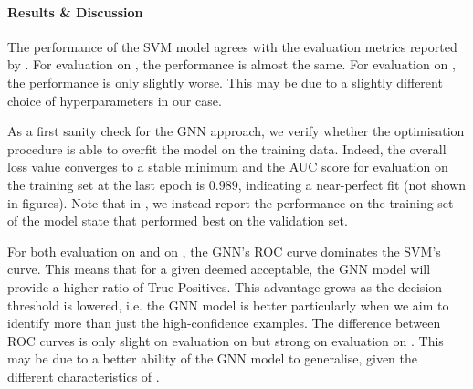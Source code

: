 \documentclass[
	fontsize=10pt, %
	twoside=false, %
	secnumdepth=1, %
  toc=indentunnumbered %
]{kaobook}
\begin{document}
\paragraph{Results \& Discussion}
The performance of the SVM model agrees with the evaluation metrics reported by
\nielsen{}. For evaluation on \PDMap, the performance is almost the same. For
evaluation on \ReconMap{}, the performance is only slightly worse. This may be due
to a slightly different choice of hyperparameters in our case.

As a first sanity check for the GNN approach, we verify whether the optimisation
procedure is able to overfit the model on the training data. Indeed, the overall
loss value converges to a stable minimum and the AUC score for evaluation on the
training set at the last epoch is $0.989$, indicating a near-perfect fit (not
shown in figures). Note that in , we instead report
the performance on the training set of the model state that performed best on
the validation set.

For both evaluation on \PDMap and on
\ReconMap{}, the GNN's ROC curve dominates the SVM's curve. This means that for a
given \FPR deemed acceptable, the GNN model will provide a higher ratio of True
Positives. This advantage grows as the decision threshold is lowered, i.e. the
GNN model is better particularly when we aim to identify more than just the
high-confidence examples. The difference between ROC curves is only slight on
evaluation on \PDMap but strong on evaluation on \ReconMap{}. This may be due to a
better ability of the GNN model to generalise, given the different
characteristics of \ReconMap{}.
\end{document}
